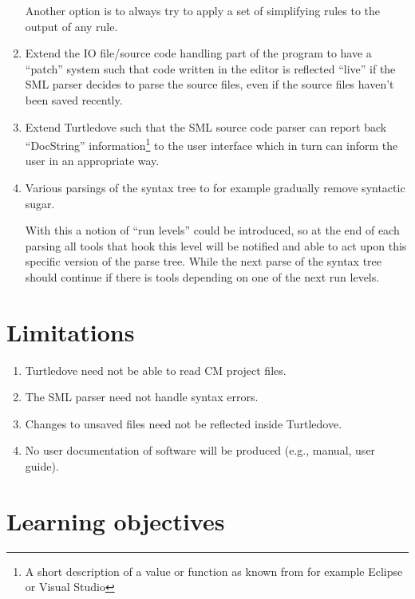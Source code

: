 \documentclass[a4paper,oneside]{article}
\begin{document}
\begin{enumerate}
  Another option is to always try to apply a set of simplifying rules to the output of any rule.

\item Extend the IO file/source code handling part of the program to have a ``patch'' system such
  that code written in the editor is reflected ``live'' if the SML parser decides to parse the
  source files, even if the source files haven't been saved recently.

\item Extend Turtledove such that the SML source code parser can report back ``DocString''
  information\footnote{A short description of a value or function as known from for example Eclipse
    or Visual Studio} to the user interface which in turn can inform the user in an appropriate way.

\item Various parsings of the syntax tree to for example gradually remove syntactic sugar.

  With this a notion of ``run levels'' could be introduced, so at the end of each parsing all tools
  that hook this level will be notified and able to act upon this specific version of the parse
  tree. While the next parse of the syntax tree should continue if there is tools depending on one
  of the next run levels.
\end{enumerate}

\section{Limitations}

\begin{enumerate}
\item Turtledove need not be able to read CM project files.

\item The SML parser need not handle syntax errors.

\item Changes to unsaved files need not be reflected inside Turtledove.

\item No user documentation of software will be produced (e.g., manual, user guide).
\end{enumerate}

\section{Learning objectives}
\end{document}
